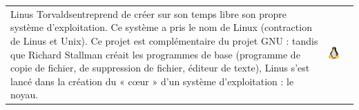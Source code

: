 \documentclass[11pt,oneside]{article}
\begin{document}
\begin{center}
\begin{tabular}{m{1cm}m{10cm}m{6cm}}
Linus Torvalds\footnotemark[2] entreprend de créer sur son temps libre son propre système d'exploitation. Ce système a pris le nom de Linux (contraction de Linus et Unix). Ce projet est complémentaire du projet GNU : tandis que Richard Stallman créait les programmes de base (programme de copie de fichier, de suppression de fichier, éditeur de texte), Linus s'est lancé dans la création du « cœur » d'un système d'exploitation : le noyau.
 & 
\begin{center}
\includegraphics[width=3cm]{png/linux.png}
\end{center}
\end{tabular}

\end{center}



%
%
%
\end{document}

